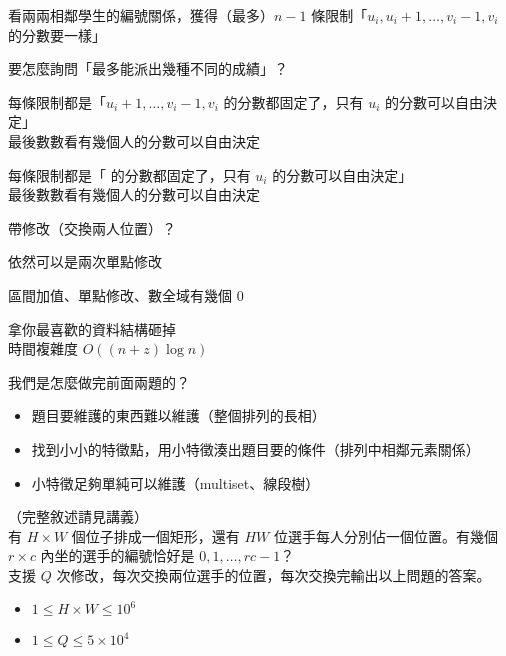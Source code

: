 \begin{frame}{}
    看兩兩相鄰學生的編號關係，獲得（最多）$n - 1$ 條限制「$u_i, u_i + 1, \dots, v_i - 1, v_i$ 的分數要一樣」

     {
        要怎麼詢問「最多能派出幾種不同的成績」？
    }

     {
        每條限制都是「$u_i + 1, \dots, v_i - 1, v_i$ 的分數都固定了，只有 $u_i$ 的分數可以自由決定」\\
        最後數數看有幾個人的分數可以自由決定
    }

     {
        每條限制都是「 的分數都固定了，只有 $u_i$ 的分數可以自由決定」\\
        最後數數看有幾個人的分數可以自由決定

    }
\end{frame}

\begin{frame}{}
    帶修改（交換兩人位置）？
    
    依然可以是兩次單點修改
\end{frame}

\begin{frame}{}
    區間加值、單點修改、數全域有幾個 $0$

    拿你最喜歡的資料結構砸掉 \\
    時間複雜度 $O((n + z) \log n)$
\end{frame}

\begin{frame}{\ebtitle}
    我們是怎麼做完前面兩題的？

    \begin{itemize}
        \item 題目要維護的東西難以維護（整個排列的長相）
        \item 找到小小的特徵點，用小特徵湊出題目要的條件（排列中相鄰元素關係）
        \item 小特徵足夠單純可以維護（multiset、線段樹）
    \end{itemize}
\end{frame}

\begin{frame}{}
    \begin{problem}
        （完整敘述請見講義）\\

        有 $H \times W$ 個位子排成一個矩形，還有 $HW$ 位選手每人分別佔一個位置。有幾個 $r \times c$ 內坐的選手的編號恰好是 $0, 1, \dots, rc - 1$？\\

        支援 $Q$ 次修改，每次交換兩位選手的位置，每次交換完輸出以上問題的答案。\\

        \begin{itemize}
            \item $1 \le H \times W \le 10^6$
            \item $1 \le Q \le 5 \times 10^4$
        \end{itemize}
    \end{problem}
\end{frame}

